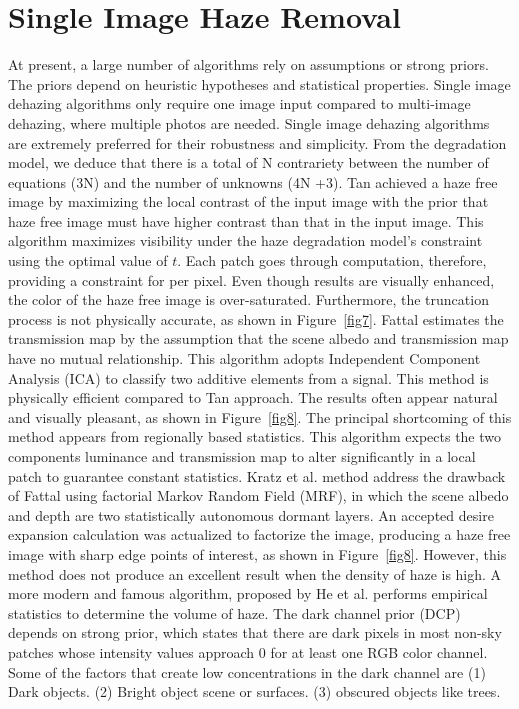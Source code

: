 \documentclass[doctor,english,listoffigures,listoftables]{thesis-uestc}
\begin{document}
\section{Single Image Haze Removal}
At present, a large number of algorithms rely on assumptions or strong priors. The priors depend on heuristic hypotheses and statistical properties. Single image dehazing algorithms only require one image input compared to multi-image dehazing, where multiple photos are needed. Single image dehazing algorithms are extremely preferred for their robustness and simplicity. From the degradation model, we deduce that there is a total of N contrariety between the number of equations (3N) and the number of unknowns (4N +3). Tan achieved a haze free image by maximizing the local contrast of the input image with the prior that haze free image must have higher contrast than that in the input image. This algorithm maximizes visibility under the haze degradation model's constraint using the optimal value of $t$. Each patch goes through computation, therefore, providing a constraint for per pixel. Even though results are visually enhanced, the color of the haze free image is over-saturated. Furthermore, the truncation process is not physically accurate, as shown in Figure~\ref{fig7}. Fattal estimates the transmission map by the assumption that the scene albedo and transmission map have no mutual relationship. This algorithm adopts Independent Component Analysis (ICA) to classify two additive elements from a signal. This method is physically efficient compared to Tan approach. The results often appear natural and visually pleasant, as shown in Figure~\ref{fig8}. The principal shortcoming of this method appears from regionally based statistics. This algorithm expects the two components luminance and transmission map to alter significantly in a local patch to guarantee constant statistics.
Kratz et al. method address the drawback of Fattal using factorial Markov Random Field (MRF), in which the scene albedo and depth are two statistically autonomous dormant layers. An accepted desire expansion calculation was actualized to factorize the image, producing a haze free image with sharp edge points of interest, as shown in Figure~\ref{fig8}. However, this method does not produce an excellent result when the density of haze is high. A more modern and famous algorithm, proposed by He et al. performs empirical statistics to determine the volume of haze. The dark channel prior (DCP) depends on strong prior, which states that there are dark pixels in most non-sky patches whose intensity values approach 0 for at least one RGB color channel. Some of the factors that create low concentrations in the dark channel are (1) Dark objects. (2) Bright object scene or surfaces. (3) obscured objects like trees.
\end{document}
